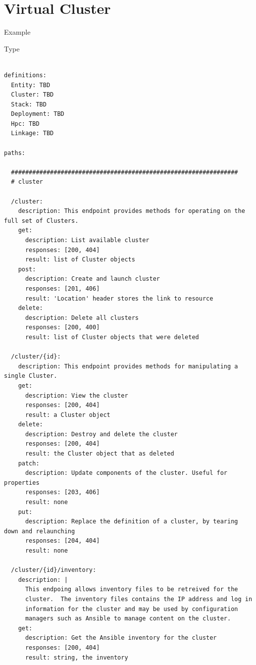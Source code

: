 \documentclass[11pt]{article}
\begin{document}
\section{Virtual Cluster}

Example

\begin{quote}

\end{quote}

Type

\begin{quote}

\end{quote}

\begin{verbatim}

definitions:
  Entity: TBD
  Cluster: TBD
  Stack: TBD
  Deployment: TBD
  Hpc: TBD
  Linkage: TBD

paths:

  ################################################################
  # cluster

  /cluster:
    description: This endpoint provides methods for operating on the full set of Clusters.
    get:
      description: List available cluster
      responses: [200, 404]
      result: list of Cluster objects
    post:
      description: Create and launch cluster
      responses: [201, 406]
      result: 'Location' header stores the link to resource
    delete:
      description: Delete all clusters
      responses: [200, 400]
      result: list of Cluster objects that were deleted

  /cluster/{id}:
    description: This endpoint provides methods for manipulating a single Cluster.
    get:
      description: View the cluster
      responses: [200, 404]
      result: a Cluster object
    delete:
      description: Destroy and delete the cluster
      responses: [200, 404]
      result: the Cluster object that as deleted
    patch:
      description: Update components of the cluster. Useful for properties
      responses: [203, 406]
      result: none
    put:
      description: Replace the definition of a cluster, by tearing down and relaunching
      responses: [204, 404]
      result: none

  /cluster/{id}/inventory:
    description: |
      This endpoing allows inventory files to be retreived for the
      cluster.  The inventory files contains the IP address and log in
      information for the cluster and may be used by configuration
      managers such as Ansible to manage content on the cluster.
    get:
      description: Get the Ansible inventory for the cluster
      responses: [200, 404]
      result: string, the inventory


\end{verbatim}
\end{document}
